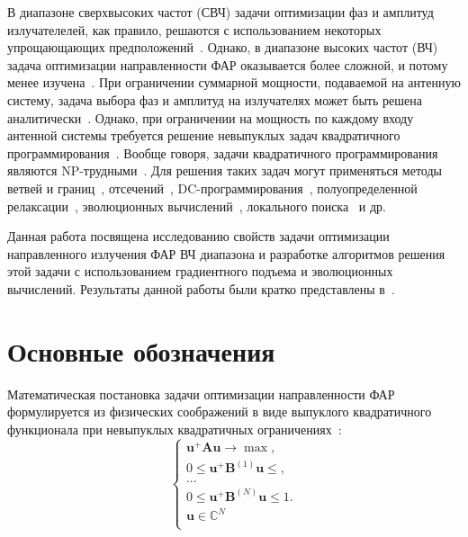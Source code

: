\documentclass{llncs}
\begin{document}
В диапазоне сверхвысоких частот (СВЧ) задачи оптимизации фаз и амплитуд излучателелей, как правило, решаются с использованием некоторых упрощающающих предположений~\cite{indenbometal:synthesis,schelkunov:antenny,fanyaev2017}. Однако, в диапазоне высоких частот (ВЧ)
задача оптимизации направленности ФАР оказывается более сложной, и потому менее изучена~\cite{kudin2014,yurkov:knd}.
При ограничении суммарной мощности, подаваемой на антенную систему, задача выбора фаз и амплитуд на излучателях
может быть решена аналитически~\cite{yurkov:farkv}.
Однако, при ограничении на мощность по каждому входу антенной системы требуется решение невыпуклых задач квадратичного программирования~\cite{fuchs:application}. Вообще говоря, задачи квадратичного программирования являются NP-трудными~\cite{murty:np}. Для решения таких задач могут применяться методы ветвей и границ~\cite{nechaeva:bandb}, отсечений~\cite{horst:handbook}, DC-программирования~\cite{strekalovsky:mindc}, полуопределенной релаксации~\cite{fuchs:application}, эволюционных вычислений~\cite{boriskinetal:efficient,rao:synthesis}, локального поиска~\cite{kochetov:local} и др.

Данная работа посвящена исследованию свойств задачи оптимизации направленного излучения ФАР ВЧ диапазона и разработке алгоритмов решения этой задачи с использованием градиентного подъема и эволюционных вычислений.
Результаты данной работы были кратко представлены в~\cite{tyu:motor22}.

\section{Основные обозначения} \label{sec:basic}

Математическая постановка задачи оптимизации направленности ФАР формулируется из физических соображений в виде выпуклого квадратичного функционала при невыпуклых квадратичных ограничениях~\cite{yurkov:farkv}:
\begin{equation}
    \begin{cases}
       \textbf{u}^{+}\textbf{Au} \rightarrow \max,\\
       0 \leq \textbf{u}^{+}\textbf{B}^{(1)}\textbf{u} \leq, \\
       ...\\
       0 \leq \textbf{u}^{+}\textbf{B}^{(N)}\textbf{u} \leq 1.\\
       \textbf{u} \in \mathbb{C}^N\\
     \end{cases}
     \label{eq:task1}
\end{equation}
\end{document}
